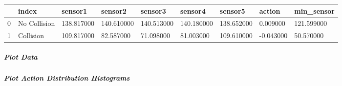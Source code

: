 \bigskip

\bigskip\noindent
\begin{tabular}{p{}p{}p{}p{}p{}p{}p{}p{}p{}}
\toprule
~ & index & sensor1 & sensor2 & sensor3 & sensor4 & sensor5 & action & min\_sensor \\
\hline
0 & No Collision & 138.817000 & 140.610000 & 140.513000 & 140.180000 & 138.652000 & 0.009000 & 121.599000 \\
\hline
1 & Collision & 109.817000 & 82.587000 & 71.098000 & 81.003000 & 109.610000 & -0.043000 & 50.570000 \\
\hline
\bottomrule
\end{tabular}

\bigskip

\subparagraph{Plot Data}

\subparagraph{Plot Action Distribution Histograms}

